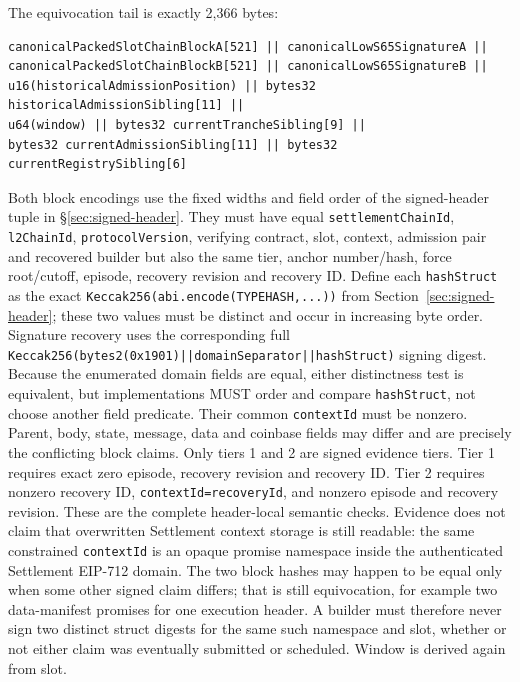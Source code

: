 \documentclass[a4paper,11pt]{article}
\newcommand{\code}[1]{\nolinkurl{#1}}
\begin{document}
The equivocation tail is exactly 2,366 bytes:
\begin{verbatim}
canonicalPackedSlotChainBlockA[521] || canonicalLowS65SignatureA ||
canonicalPackedSlotChainBlockB[521] || canonicalLowS65SignatureB ||
u16(historicalAdmissionPosition) || bytes32 historicalAdmissionSibling[11] ||
u64(window) || bytes32 currentTrancheSibling[9] ||
bytes32 currentAdmissionSibling[11] || bytes32 currentRegistrySibling[6]
\end{verbatim}
Both block encodings use the fixed widths and field order of the signed-header
tuple in \S\ref{sec:signed-header}.  They must have equal
\code{settlementChainId}, \code{l2ChainId}, \code{protocolVersion}, verifying
contract, slot, context, admission pair and recovered builder but
also the same tier, anchor number/hash, force root/cutoff, episode, recovery
revision and recovery ID.  Define each \code{hashStruct} as the exact
\code{Keccak256(abi.encode(TYPEHASH,...))} from
Section~\ref{sec:signed-header}; these two values must be distinct and occur in
increasing byte order.  Signature recovery uses the corresponding full
\code{Keccak256(bytes2(0x1901)||domainSeparator||hashStruct)} signing digest.
Because the enumerated domain fields are equal, either distinctness test is
equivalent, but implementations MUST order and compare \code{hashStruct}, not
choose another field predicate.  Their common \code{contextId} must be
nonzero.  Parent, body, state,
message, data and coinbase fields may differ and are precisely the conflicting
block claims.  Only tiers 1 and 2 are signed evidence tiers.  Tier 1 requires exact
zero episode, recovery revision and recovery ID.  Tier 2 requires nonzero
recovery ID, \code{contextId=recoveryId}, and nonzero episode and recovery
revision.  These are the complete header-local semantic checks.  Evidence does
not claim that overwritten Settlement context storage is still readable: the
same constrained \code{contextId} is an opaque promise namespace
inside the authenticated Settlement EIP-712 domain.  The two block
hashes may happen to be equal only when some other signed claim differs; that
is still equivocation, for example two data-manifest promises for one execution
header.  A builder must therefore never sign two distinct struct digests for
the same such namespace and slot, whether or not either claim was eventually
submitted or scheduled.
Window is derived again from slot.
\end{document}
